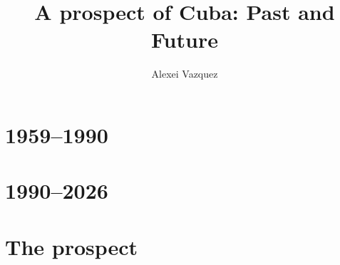 \documentclass[10pt]{book}
\title{A prospect of Cuba: Past and Future}
\author{Alexei Vazquez}
\date{}
\begin{document}
\maketitle

\setcounter{tocdepth}{1}
\tableofcontents




\part{1959--1990}






\part{1990--2026}







\part{The prospect}
















\end{document}
